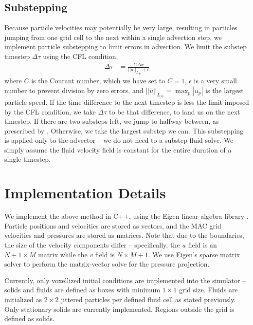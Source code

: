 \documentclass[sigconf]{acmart}
\begin{document}
\subsection{Substepping}

Because particle velocities may potentially be very large, resulting in particles jumping from one grid cell to the next within a single advection step, we implement particle substepping to limit errors in advection. We limit the substep timestep $\Delta\tau$ using the CFL condition,
\begin{align}
  \Delta{}\tau &= \frac{C\Delta{}x}{||\bar{u}||_{L_\infty}+\epsilon}
\end{align}
where $C$ is the Courant number, which we have set to $C=1$, $\epsilon$ is a very small number to prevent division by zero errors, and $||\bar{u}||_{L_\infty} = \max_p |\bar{u}_p| $ is the largest particle speed. If the time difference to the next timestep is less the limit imposed by the CFL condition, we take $\Delta\tau$ to be that difference, to land us on the next timestep. If there are two substeps left, we jump to halfway between, as prescribed by \cite{bridson2015}. Otherwise, we take the largest substep we can. This substepping is applied only to the advector -- we do not need to a substep fluid solve. We simply assume the fluid velocity field is constant for the entire duration of a single timestep.

\section{Implementation Details}

We implement the above method in C++, using the Eigen linear algebra library \cite{eigen}. Particle positions and velocities are stored as vectors, and the MAC grid velocities and pressures are stored as matrices. Note that due to the boundaries, the size of the velocity components differ -- specifically, the $u$ field is an $N+1\times{}M$ matrix while the $v$ field is $N\times{}M+1$. We use Eigen's sparse matrix solver to perform the matrix-vector solve for the pressure projection.

Currently, only voxellized initial conditions are implemented into the simulator -- solids and fluids are defined as boxes with minimum $1\times{}1$ grid size. Fluids are initialized as $2\times{}2$ jittered particles per defined fluid cell as stated previously. Only stationary solids are currently implemented. Regions outside the grid is defined as solids.
\end{document}
